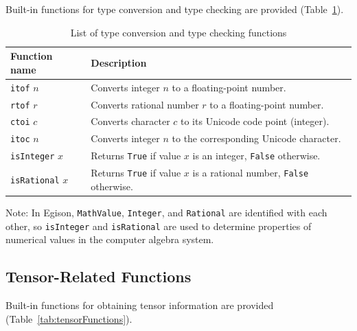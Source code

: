Built-in functions for type conversion and type checking are provided (Table~\ref{tab:typeFunctions}).

\begin{table}[h]
  \begin{center}
    \begin{tabular}{ | l | p{9cm} |}
    \hline
    Function name & Description \\ \hline
    \texttt{itof} $n$ & Converts integer $n$ to a floating-point number. \\ \hline
    \texttt{rtof} $r$ & Converts rational number $r$ to a floating-point number. \\ \hline
    \texttt{ctoi} $c$ & Converts character $c$ to its Unicode code point (integer). \\ \hline
    \texttt{itoc} $n$ & Converts integer $n$ to the corresponding Unicode character. \\ \hline
    \texttt{isInteger} $x$ & Returns \texttt{True} if value $x$ is an integer, \texttt{False} otherwise. \\ \hline
    \texttt{isRational} $x$ & Returns \texttt{True} if value $x$ is a rational number, \texttt{False} otherwise. \\ \hline
    \end{tabular}
\end{center}
    \caption{List of type conversion and type checking functions}
    \label{tab:typeFunctions}
\end{table}

Note: In Egison, \lstinline{MathValue}, \lstinline{Integer}, and \lstinline{Rational} are identified with each other, so \lstinline{isInteger} and \lstinline{isRational} are used to determine properties of numerical values in the computer algebra system.

\subsection{Tensor-Related Functions}

Built-in functions for obtaining tensor information are provided (Table~\ref{tab:tensorFunctions}).

